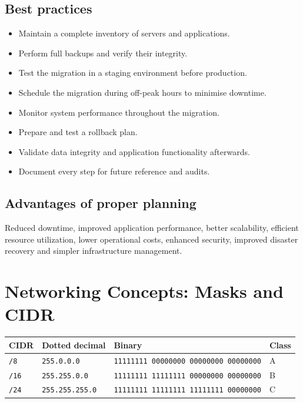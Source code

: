 \documentclass[11pt,a4paper]{article}
\begin{document}
\subsection{Best practices}

\begin{itemize}\itemsep2pt
  \item Maintain a complete inventory of servers and applications.
  \item Perform full backups and verify their integrity.
  \item Test the migration in a staging environment before production.
  \item Schedule the migration during off-peak hours to minimise downtime.
  \item Monitor system performance throughout the migration.
  \item Prepare and test a rollback plan.
  \item Validate data integrity and application functionality afterwards.
  \item Document every step for future reference and audits.
\end{itemize}

\subsection{Advantages of proper planning}

Reduced downtime, improved application performance, better scalability, efficient resource
utilization, lower operational costs, enhanced security, improved disaster recovery and
simpler infrastructure management.

\newpage
\section{Networking Concepts: Masks and CIDR}



\begin{tabularx}{\textwidth}{@{}llXl@{}}
\toprule
\rowcolor{tablehead}\textbf{CIDR} & \textbf{Dotted decimal} & \textbf{Binary} &
\textbf{Class} \\
\midrule
\texttt{/8} & \texttt{255.0.0.0} & \texttt{11111111 00000000 00000000 00000000} & A \\
\texttt{/16} & \texttt{255.255.0.0} & \texttt{11111111 11111111 00000000 00000000} & B \\
\texttt{/24} & \texttt{255.255.255.0} & \texttt{11111111 11111111 11111111 00000000} & C \\
\bottomrule
\end{tabularx}
\end{document}
